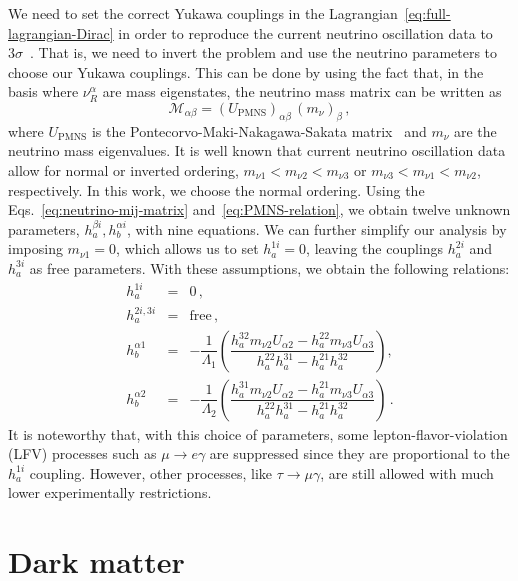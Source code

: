 \documentclass[12pt,letterpaper]{article}
\begin{document}
We need to set the correct Yukawa couplings in the Lagrangian~\eqref{eq:full-lagrangian-Dirac} in order to reproduce the current neutrino oscillation data to $3\sigma$~\cite{deSalas:2017kay}. That is, we need to invert the problem and use the neutrino parameters to choose our Yukawa couplings. This can be done by using the fact that, in the basis where $\nu_R^{\alpha}$ are mass eigenstates, the neutrino mass matrix can be written as~\cite{Kanemura:2011jj}
\begin{equation}
\label{eq:PMNS-relation}
\mathcal{M}_{\alpha\beta}=(U_{\text{PMNS}})_{\alpha\beta}\,(m_{\nu})_{\beta}\,,
\end{equation}
where $U_{\text{PMNS}}$ is the Pontecorvo-Maki-Nakagawa-Sakata matrix~\cite{Maki:1962mu} and $m_{\nu}$ are the neutrino mass eigenvalues.
It is well known that current neutrino oscillation data allow for normal or inverted ordering, $m_{\nu 1}<m_{\nu 2}<m_{\nu 3}$ or $m_{\nu 3}<m_{\nu 1}<m_{\nu 2}$, respectively.
In this work, we choose the normal ordering. Using the Eqs.~\eqref{eq:neutrino-mij-matrix} and~\eqref{eq:PMNS-relation}, we obtain twelve unknown parameters, $h_a^{\beta i}, h_b^{\alpha i}$, with nine equations. We can further simplify our analysis by imposing $m_{\nu 1}=0$, which allows us to set $h_a^{1i}=0$, leaving the couplings $h_a^{2i}$ and $h_a^{3i}$ as free parameters.
With these assumptions, we obtain the following relations:
\begin{eqnarray}
\label{eq:ha-and-hb}
h_a^{1i}&=&0\,, \nonumber\\
h_a^{2i,3i}&=& \text{free}\,, \nonumber\\
h_b^{\alpha 1}&=& -\dfrac{1}{\Lambda_1}
\left(\dfrac{h_a^{32} m_{\nu 2} U_{\alpha 2} - h_a^{22} m_{\nu 3} U_{\alpha 3}}{h_a^{22} h_a^{31}- h_a^{21} h_a^{32} }\right), \nonumber\\
h_b^{\alpha 2}&=& -\dfrac{1}{\Lambda_2}
\left(\dfrac{h_a^{31} m_{\nu 2} U_{\alpha 2} - h_a^{21} m_{\nu 3} U_{\alpha 3}}{h_a^{22} h_a^{31}- h_a^{21} h_a^{32} }\right)\,.
\end{eqnarray}
It is noteworthy that, with this choice of parameters, some lepton-flavor-violation (LFV) processes such as $\mu\to e\gamma$ are suppressed since they are proportional to the $h_a^{1i}$ coupling. However, other processes, like $\tau\to \mu\gamma$, are still allowed with much lower experimentally restrictions.


\section{Dark matter}
\label{sec:DM}
\end{document}
